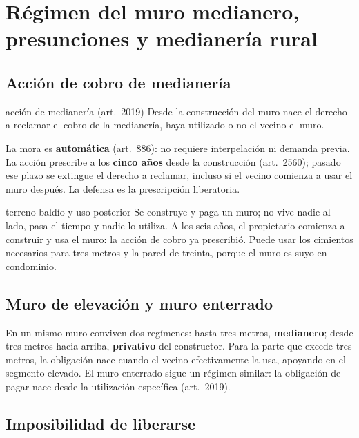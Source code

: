 \documentclass[12pt,oneside]{book}
\begin{document}
\chapter[Régimen del muro medianero, presunciones y medianería rural]{Régimen del muro medianero, presunciones y medianería rural}\label{cap:regimen-medianero}

\section{Acción de cobro de medianería}

\begin{definicion}{acción de medianería (art.~2019)}
Desde la construcción del muro nace el derecho a reclamar el cobro de la medianería, haya utilizado o no el vecino el muro.
\end{definicion}

La mora es \textbf{automática} (art.~886): no requiere interpelación ni demanda previa. La acción prescribe a los \textbf{cinco años} desde la construcción (art.~2560); pasado ese plazo se extingue el derecho a reclamar, incluso si el vecino comienza a usar el muro después. La defensa es la prescripción liberatoria.

\begin{ejemplo}{terreno baldío y uso posterior}
Se construye y paga un muro; no vive nadie al lado, pasa el tiempo y nadie lo utiliza. A los seis años, el propietario comienza a construir y usa el muro: la acción de cobro ya prescribió. Puede usar los cimientos necesarios para tres metros y la pared de treinta, porque el muro es suyo en condominio.
\end{ejemplo}

\section{Muro de elevación y muro enterrado}

En un mismo muro conviven dos regímenes: hasta tres metros, \textbf{medianero}; desde tres metros hacia arriba, \textbf{privativo} del constructor. Para la parte que excede tres metros, la obligación nace cuando el vecino efectivamente la usa, apoyando en el segmento elevado. El muro enterrado sigue un régimen similar: la obligación de pagar nace desde la utilización específica (art.~2019).

\section{Imposibilidad de liberarse}
\end{document}
